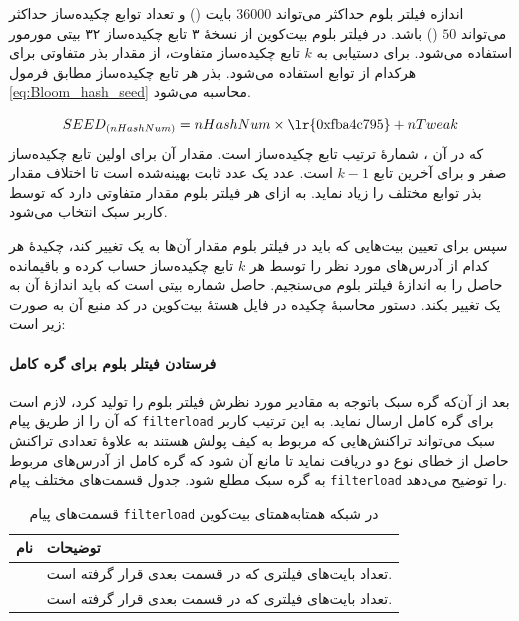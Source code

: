 اندازه فیلتر بلوم حداکثر می‌تواند $36000$ بایت () و تعداد توابع چکیده‌ساز حداکثر می‌تواند $50$ () باشد. در فیلتر بلوم بیت‌کوین از نسخهٔ ۳ تابع چکیده‌ساز ۳۲ بیتی 
مورمور 
استفاده می‌شود\cite{Hearn2013}. برای دستیابی به $k$ تابع چکیده‌ساز متفاوت، از مقدار 
بذر 
متفاوتی برای هرکدام از توابع استفاده می‌شود. بذر هر تابع چکیده‌ساز مطابق فرمول \eqref{eq:Bloom_hash_seed} محاسبه می‌شود.

\begin{equation}
\label{eq:Bloom_hash_seed}
SEED_{(nHashNum)} = nHashNum \times \text{\lr{0xfba4c795}} + nTweak
\end{equation}
که در آن ، شمارهٔ ترتیب تابع چکیده‌ساز است. مقدار آن برای اولین تابع چکیده‌ساز صفر و برای آخرین تابع $k-1$ است. عدد  یک عدد ثابت بهینه‌شده است تا اختلاف مقدار بذر توابع مختلف را زیاد نماید.  به ازای هر فیلتر بلوم مقدار متفاوتی دارد که توسط کاربر سبک انتخاب می‌شود. 

سپس برای تعیین بیت‌هایی که باید در فیلتر بلوم مقدار آن‌ها به یک تغییر کند، چکیدهٔ هر کدام از آدرس‌های مورد نظر را توسط هر $k$ تابع چکیده‌ساز حساب کرده و باقیمانده‌ حاصل را به اندازهٔ فیلتر بلوم می‌سنجیم. حاصل شماره بیتی است که باید اندازه‌ٔ آن به یک تغییر بکند. دستور محاسبهٔ چکیده در فایل  هسته‌ٔ بیت‌کوین در کد منبع آن \cite{Bitcoincore.org}به صورت زیر است:





\paragraph{فرستادن فیتلر بلوم برای گره کامل}

بعد از آن‌که گره سبک باتوجه به مقادیر مورد نظرش فیلتر بلوم را تولید کرد، لازم است که آن را از طریق پیام \texttt{filterload} برای گره کامل ارسال نماید. به این ترتیب کاربر سبک می‌تواند تراکنش‌هایی که مربوط به کیف پولش هستند به علاوهٔ تعدادی تراکنش حاصل از خطای نوع دو دریافت نماید تا مانع آن شود که گره کامل از آدرس‌های مربوط به گره سبک مطلع شود. جدول  قسمت‌های مختلف پیام \texttt{filterload} را توضیح می‌دهد.

\begin{xltabular}{\textwidth}{|c|X|}
	\caption{
		قسمت‌های پیام \texttt{filterload} در شبکه همتا‌به‌همتای بیت‌کوین
		\label{table:filterloadMessage}}\\
	\hline
	\textbf{نام} & {\textbf{توضیحات}} \\
	\hline \hline
	 &{%
تعداد بایت‌های فیلتری که در قسمت بعدی قرار گرفته است.	
}\\
\hline
	 &{%
	تعداد بایت‌های فیلتری که در قسمت بعدی قرار گرفته است.	
}\\
\hline
	
\end{xltabular}

